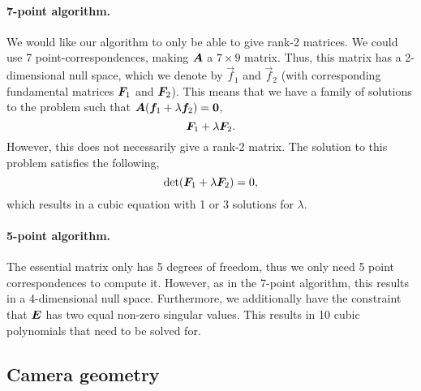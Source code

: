 \paragraph{7-point algorithm.}

We would like our algorithm to only be able to give rank-2 matrices. We could
use 7 point-correspondences, making $\bm{A}$ a $7\times 9$ matrix. Thus, this matrix has a 2-dimensional null space, which we
denote by $\vec{f}_1$ and $\vec{f}_2$ (with corresponding fundamental matrices
$\bm{F}_1$ and $\bm{F}_2$). This means that we have a family of solutions to
the problem such that $\bm{A} (\bm{f}_1 + \lambda \bm{f}_2) = \bm{0}$, \[
    \bm{F}_1 + \lambda \bm{F}_2.
\]
However, this does not necessarily give a rank-2 matrix. The solution to this
problem satisfies the following, \[
    \det{\mat{F}_1 + \lambda \mat{F}_2} = 0,
\]
which results in a cubic equation with 1 or 3 solutions for $\lambda$.

\paragraph{5-point algorithm.}

The essential matrix only has 5 degrees of freedom, thus we only need 5 point
correspondences to compute it. However, as in the 7-point algorithm, this
results in a 4-dimensional null space. Furthermore, we additionally have the
constraint that $\bm{E}$ has two equal non-zero singular values. This results
in 10 cubic polynomials that need to be solved for.

\subsection{Camera geometry}

